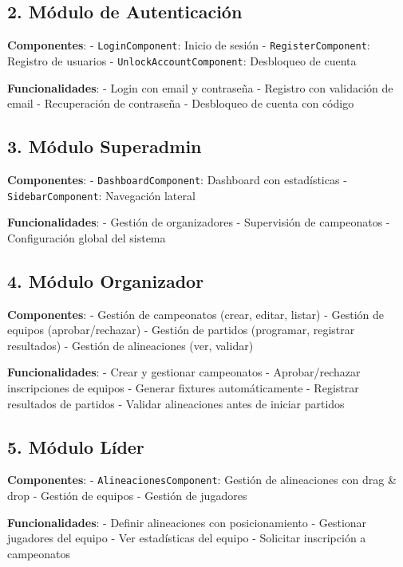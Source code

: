 \documentclass[
  spanish,
  11pt,
  letterpaper,
]{book}
\begin{document}
\subsection{2. Módulo de
Autenticación}\label{muxf3dulo-de-autenticaciuxf3n-1}

\textbf{Componentes}: - \texttt{LoginComponent}: Inicio de sesión -
\texttt{RegisterComponent}: Registro de usuarios -
\texttt{UnlockAccountComponent}: Desbloqueo de cuenta

\textbf{Funcionalidades}: - Login con email y contraseña - Registro con
validación de email - Recuperación de contraseña - Desbloqueo de cuenta
con código

\subsection{3. Módulo Superadmin}\label{muxf3dulo-superadmin-1}

\textbf{Componentes}: - \texttt{DashboardComponent}: Dashboard con
estadísticas - \texttt{SidebarComponent}: Navegación lateral

\textbf{Funcionalidades}: - Gestión de organizadores - Supervisión de
campeonatos - Configuración global del sistema

\subsection{4. Módulo Organizador}\label{muxf3dulo-organizador-1}

\textbf{Componentes}: - Gestión de campeonatos (crear, editar, listar) -
Gestión de equipos (aprobar/rechazar) - Gestión de partidos (programar,
registrar resultados) - Gestión de alineaciones (ver, validar)

\textbf{Funcionalidades}: - Crear y gestionar campeonatos -
Aprobar/rechazar inscripciones de equipos - Generar fixtures
automáticamente - Registrar resultados de partidos - Validar
alineaciones antes de iniciar partidos

\subsection{5. Módulo Líder}\label{muxf3dulo-luxedder-1}

\textbf{Componentes}: - \texttt{AlineacionesComponent}: Gestión de
alineaciones con drag \& drop - Gestión de equipos - Gestión de
jugadores

\textbf{Funcionalidades}: - Definir alineaciones con posicionamiento -
Gestionar jugadores del equipo - Ver estadísticas del equipo - Solicitar
inscripción a campeonatos
\end{document}
